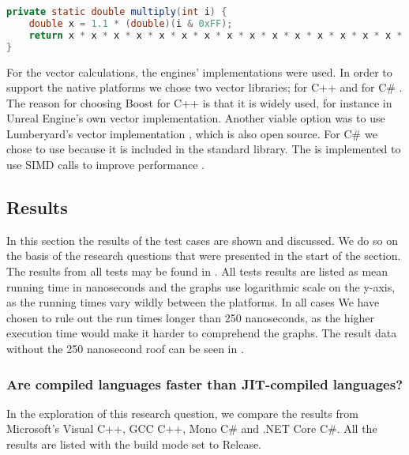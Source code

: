 \begin{lstlisting}[label={lst:sestoft:multiply}, caption={Sestoft's proposed benchmarking method}, language={Java}, style=java-highlight]
private static double multiply(int i) {
    double x = 1.1 * (double)(i & 0xFF);
    return x * x * x * x * x * x * x * x * x * x * x * x * x * x * x * x * x * x * x * x;
}
\end{lstlisting}

For the vector calculations, the engines' implementations were used. In order to support the native platforms we chose two vector libraries;  for C++ \cite{cpp:vector} and  for C\# \cite{system:numerics:vectors}. The reason for choosing Boost for C++ is that it is widely used, for instance in Unreal Engine's own vector implementation. Another viable option was to use Lumberyard's vector implementation \cite{lumberyard:vector}, which is also open source. For C\# we chose to use  because it is included in the standard library. The  is implemented to use \ac{SIMD} calls to improve performance \cite{msdn:vectors}.

\subsection{Results}
In this section the results of the test cases are shown and discussed. We do so on the basis of the research questions that were presented in the start of the section. The results from all tests may be found in . All tests results are listed as mean running time in nanoseconds and the graphs use logarithmic scale on the y-axis, as the running times vary wildly between the platforms. In all cases We have chosen to rule out the run times longer than 250 nanoseconds, as the higher execution time would make it harder to comprehend the graphs. The result data without the 250 nanosecond roof can be seen in .

\subsubsection{Are compiled languages faster than \ac{JIT}-compiled languages?}
In the exploration of this research question, we compare the results from Microsoft's Visual C++, \ac{GCC} C++, Mono C\# and .NET Core C\#. All the results are listed with the build mode set to Release. 


